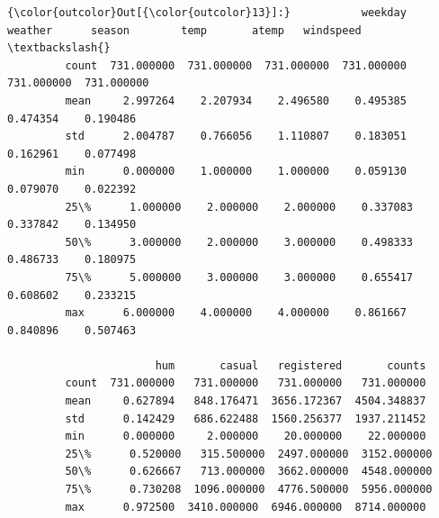 \documentclass[11pt]{article}
\begin{document}
\begin{Verbatim}[commandchars=\\\{\}]
{\color{outcolor}Out[{\color{outcolor}13}]:}           weekday     weather      season        temp       atemp   windspeed  \textbackslash{}
         count  731.000000  731.000000  731.000000  731.000000  731.000000  731.000000   
         mean     2.997264    2.207934    2.496580    0.495385    0.474354    0.190486   
         std      2.004787    0.766056    1.110807    0.183051    0.162961    0.077498   
         min      0.000000    1.000000    1.000000    0.059130    0.079070    0.022392   
         25\%      1.000000    2.000000    2.000000    0.337083    0.337842    0.134950   
         50\%      3.000000    2.000000    3.000000    0.498333    0.486733    0.180975   
         75\%      5.000000    3.000000    3.000000    0.655417    0.608602    0.233215   
         max      6.000000    4.000000    4.000000    0.861667    0.840896    0.507463   
         
                       hum       casual   registered       counts  
         count  731.000000   731.000000   731.000000   731.000000  
         mean     0.627894   848.176471  3656.172367  4504.348837  
         std      0.142429   686.622488  1560.256377  1937.211452  
         min      0.000000     2.000000    20.000000    22.000000  
         25\%      0.520000   315.500000  2497.000000  3152.000000  
         50\%      0.626667   713.000000  3662.000000  4548.000000  
         75\%      0.730208  1096.000000  4776.500000  5956.000000  
         max      0.972500  3410.000000  6946.000000  8714.000000  
\end{Verbatim}
            
\end{document}

